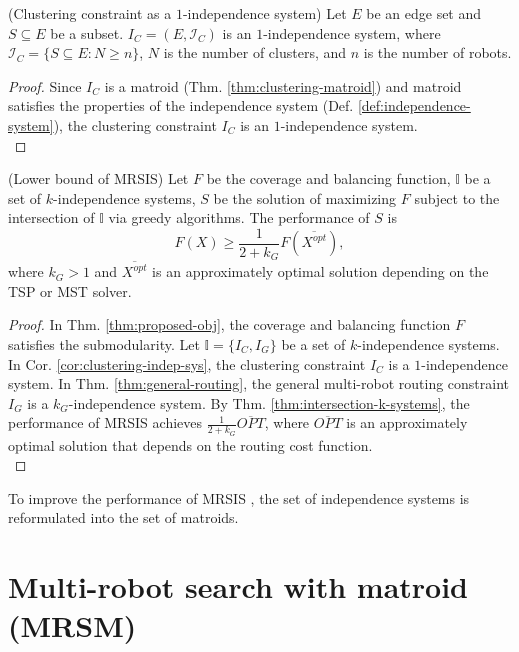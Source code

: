 \begin{corollary} \label{cor:clustering-indep-sys} (Clustering constraint as a $1$-independence system)
Let $E$ be an edge set and $S \subseteq E$ be a subset.
$I_C=(E, \mathcal{I}_C)$ is an $1$-independence system, where $\mathcal{I}_C=\{S \subseteq E : N \geq n \}$, $N$ is the number of clusters, and $n$ is the number of robots.
\end{corollary}
\begin{proof}
Since $I_C$ is a matroid (Thm. \ref{thm:clustering-matroid}) and matroid satisfies the properties of the independence system (Def. \ref{def:independence-system}),
the clustering constraint $I_C$ is an $1$-independence system.
\\
\end{proof}

\begin{theorem}  \label{def:independence-bound}
 (Lower bound of MRSIS\cite{li2024mrsis}) Let $F$ be the coverage and balancing function, $\mathit{\mathbb{I}}$ be a set of $k$-independence systems, $S$ be the solution of maximizing $F$ subject to the intersection of $\mathit{\mathbb{I}}$ via greedy algorithms. The performance of $S$ is
\begin{equation*}
      F(X) \geq \frac{1}{2+k_G} F(\overline{X^{opt}}),
\end{equation*}
where $k_G > 1$ and $\overline{X^{opt}}$ is an approximately optimal solution depending on the TSP or MST solver.
\end{theorem}
\begin{proof}
In Thm. \ref{thm:proposed-obj}, the coverage and balancing function $F$ satisfies the submodularity.
Let $\mathit{\mathbb{I}}=\{I_C, I_G\}$ be a set of $k$-independence systems. In Cor. \ref{cor:clustering-indep-sys}, the clustering constraint $I_C$ is a $1$-independence system. In Thm. \ref{thm:general-routing}, the general multi-robot routing constraint $I_G$ is a $k_G$-independence system.
By Thm. \ref{thm:intersection-k-systems}, the performance of MRSIS \cite{li2024mrsis} achieves $\frac{1}{2+k_G}\overline{OPT}$, where $\overline{OPT}$ is an approximately optimal solution that depends on the routing cost function.
\\
\end{proof}

To improve the performance of MRSIS \cite{li2024mrsis}, the set of independence systems is reformulated into the set of matroids.

\section{Multi-robot search with matroid (MRSM)}

